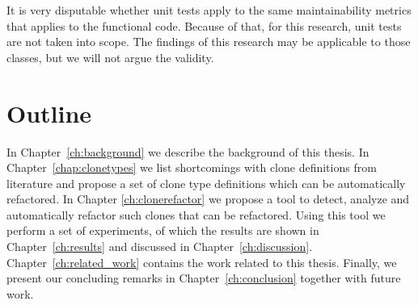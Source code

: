 It is very disputable whether unit tests apply to the same maintainability metrics that applies to the functional code. Because of that, for this research, unit tests are not taken into scope. The findings of this research may be applicable to those classes, but we will not argue the validity.

\section{Outline}
In Chapter~\ref{ch:background} we describe the background of this thesis. In Chapter~\ref{chap:clonetypes} we list shortcomings with clone definitions from literature and propose a set of clone type definitions which can be automatically refactored. In Chapter \ref{ch:clonerefactor} we propose a tool to detect, analyze and automatically refactor such clones that can be refactored. Using this tool we perform a set of experiments, of which the results are shown in Chapter~\ref{ch:results} and discussed in Chapter~\ref{ch:discussion}. Chapter~\ref{ch:related_work} contains the work related to this thesis. Finally, we present our concluding remarks in Chapter~\ref{ch:conclusion} together with future work.
